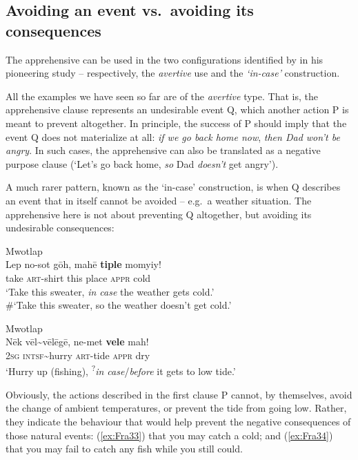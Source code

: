 \documentclass[output=paper,colorlinks,citecolor=brown]{langscibook}
\begin{document}
\subsection{Avoiding an event vs.\ avoiding its consequences}
\label{subsec:avoiding}
 
The  apprehensive can be used in the two configurations identified by \citet[299]{lichtenberk1995} in his pioneering study -- respectively, the \textit{avertive} use and the \textit{`in-case'} construction.

All the examples we have seen so far are of the \textit{avertive} type. That is, the apprehensive clause represents an undesirable event Q, which another action P is meant to prevent altogether. In principle, the success of P should imply that the event Q does not materialize at all: \textit{if we go back home now}, \textit{then Dad won't be angry}. In such cases, the apprehensive can also be translated as a negative purpose clause (`Let's go back home, \textit{so} Dad \textit{doesn't} get angry').

A much rarer pattern, known as the `in-case' construction, is when Q describes an event that in itself cannot be avoided -- e.g.\ a weather situation. The apprehensive here is not about preventing Q altogether, but avoiding its undesirable consequences:

\ea \label{ex:Fra33} \textnormal{Mwotlap}  \\
\gll Lep no-sot gōh, mahē \textbf{tiple} momyiy! \\
take \textsc{art}-shirt this place \textsc{appr} cold \\
\glt `Take this sweater, \textit{in case} the weather gets cold.' \\
\#`Take this sweater, so the weather doesn't get cold.' 
\z


\ea \label{ex:Fra34} \textnormal{Mwotlap}  \\
\gll Nēk vēl\textasciitilde vēlēgē, ne-met \textbf{vele} mah! \\
\textsc{2sg} \textsc{intsf}\textasciitilde hurry \textsc{art}-tide \textsc{appr} dry \\
\glt `Hurry up (fishing), \textsuperscript{?}\textit{in case}/\textit{before} it gets to low tide.' 
\z


 Obviously, the actions described in the first clause P cannot, by themselves, avoid the change of ambient temperatures, or prevent the tide from going low. Rather, they indicate the behaviour that would help prevent the negative consequences of those natural events: (\ref{ex:Fra33}) that you may catch a cold; and (\ref{ex:Fra34}) that you may fail to catch any fish while you still could.
\end{document}
